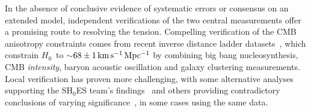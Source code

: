 \documentclass[%
 reprint,
 superscriptaddress,
 nofootinbib,
 amsmath,amssymb,
 aps,
]{revtex4-2}
\newcommand{\hubble}{\ensuremath{H_0}}
\newcommand{\kmsmpc}{\ensuremath{{\rm km\,s^{-1}\,Mpc^{-1}}}}
\begin{document}
In the absence of conclusive evidence of systematic errors or consensus on an extended model, independent verifications of the two central measurements offer a promising route to resolving the tension. Compelling verification of the CMB anisotropy constraints comes from recent inverse distance ladder datasets~\cite{Addison_etal:2017,DES_H_0:2017,Philcox_etal:2020}, which constrain \hubble\ to $\sim$$68 \pm 1\,\kmsmpc$ by combining big bang nucleosynthesis, CMB {\it intensity}, baryon acoustic oscillation and galaxy clustering measurements. Local verification has proven more challenging, with some alternative analyses supporting the SH$_0$ES team's findings~\cite{Yuan_etal:2019,Huang_etal:2020,H0LICOW_XIII:2020,TDCOSMO_I:2020,Pesce_etal:2020} and others providing contradictory conclusions of varying significance~\cite{Freedman_etal:2019,Freedman_etal:2020,TDCOSMO_IV:2020,Boruah_etal:2020}, in some cases using the same data.
\end{document}
